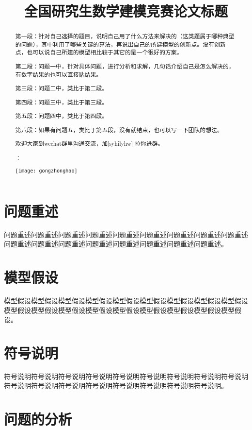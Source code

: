 \documentclass[bwprint]{gmcmthesis}
\title{全国研究生数学建模竞赛论文标题}
\begin{document}
\maketitle
\begin{abstract}
    第一段：针对自己选择的题目，说明自己用了什么方法来解决的（这类题属于哪种典型的问题），其中利用了哪些关键的算法，再说出自己的所建模型的创新点。没有创新点，也可以说自己所建的模型相比较于其它的是一个很好的方案。

    第二段：问题一中，针对具体问题，进行分析和求解，几句话介绍自己是怎么解决的，有数字结果的也可以直接贴结果。

    第三段：问题二中，类比于第二段。

    第四段：问题三中，类比于第三段。

    第五段：问题四中，类比于第四段。

    第六段：如果有问题五，类比于第五段，没有就结束，也可以写一下团队的想法。

    欢迎大家到wechat群里沟通交流，加[syhilyhw] 拉你进群。


    ：

    \centerline{\texttt{[image: gongzhonghao]}}


\end{abstract}

\pagestyle{plain}

\tableofcontents

\section{问题重述}
问题重述问题重述问题重述问题重述问题重述问题重述问题重述问题重述问题重述问题重述问题重述问题重述问题重述问题重述问题重述问题重述问题重述。
\section{模型假设}
模型假设模型假设模型假设模型假设模型假设模型假设模型假设模型假设模型假设模型假设模型假设模型假设模型假设模型假设模型假设模型假设模型假设模型假设。
\section{符号说明}
符号说明符号说明符号说明符号说明符号说明符号说明符号说明符号说明符号说明符号说明符号说明符号说明符号说明符号说明符号说明符号说明符号说明。
\section{问题的分析}
\end{document}

